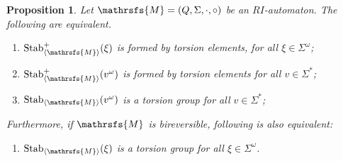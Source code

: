 \documentclass{amsart}
\newtheorem{proposition}[theorem]{Proposition}
\begin{document}
\begin{proposition}\label{prop: positive torsion equivalences2}
\label{prop: density prop of periodic points2}
Let ${{{\mathrsfs{{M}}}}}=({{{Q}}},{{{\Sigma}}},{{{\cdot}}},{{{\circ}}})$ be an $RI$-automaton. The following are equivalent.
\begin{enumerate}[label=(\roman{enumi})]
\item \label{posrel1} $\operatorname{Stab}^{+}_{{{\langle}{{\mathrsfs{{{M}}}}}{\rangle}}}(\xi)$ is formed by torsion elements, for all $\xi\in {{{\Sigma}}}^{\omega}$;
\item\label{posrel2} $\operatorname{Stab}^{+}_{{{\langle}{{\mathrsfs{{{M}}}}}{\rangle}}}(v^{\omega})$ is formed by torsion elements for all $v\in {{{\Sigma}}}^{\ast}$;
\item\label{posrel5} $\operatorname{Stab}_{{{\langle}{{\mathrsfs{{{M}}}}}{\rangle}}}(v^{\omega})$  is a torsion group for all $v\in {{{\Sigma}}}^{\ast}$;
\end{enumerate}
Furthermore, if ${{{\mathrsfs{{M}}}}}$ is bireversible, following is also equivalent:
\begin{enumerate}[label=(\roman{enumi}),resume] 

\item\label{posrel6} $\operatorname{Stab}_{{{\langle}{{\mathrsfs{{{M}}}}}{\rangle}}}(\xi)$ is a torsion group for all $\xi\in {{{\Sigma}}}^{\omega}$.
\end{enumerate}
\end{proposition}
\end{document}
